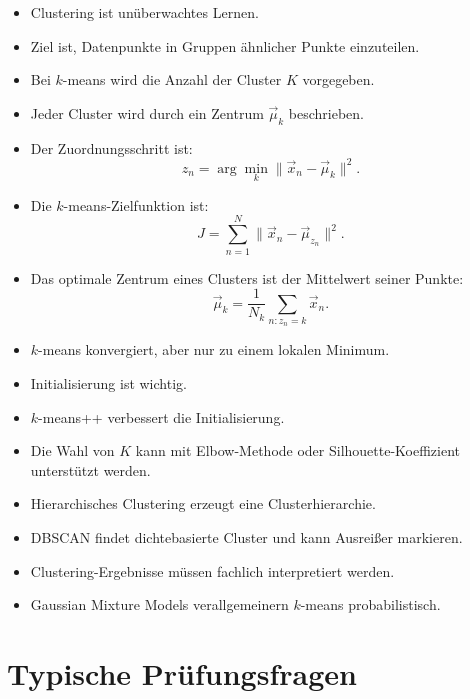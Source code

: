 \begin{itemize}
    \item Clustering ist unüberwachtes Lernen.
    \item Ziel ist, Datenpunkte in Gruppen ähnlicher Punkte einzuteilen.
    \item Bei \(k\)-means wird die Anzahl der Cluster \(K\) vorgegeben.
    \item Jeder Cluster wird durch ein Zentrum \(\vec{\mu}_k\) beschrieben.
    \item Der Zuordnungsschritt ist:
    \[
        z_n
        =
        \arg\min_k
        \|\vec{x}_n-\vec{\mu}_k\|^2.
    \]
    \item Die \(k\)-means-Zielfunktion ist:
    \[
        J
        =
        \sum_{n=1}^{N}
        \|\vec{x}_n-\vec{\mu}_{z_n}\|^2.
    \]
    \item Das optimale Zentrum eines Clusters ist der Mittelwert seiner Punkte:
    \[
        \vec{\mu}_k
        =
        \frac{1}{N_k}
        \sum_{n:z_n=k}
        \vec{x}_n.
    \]
    \item \(k\)-means konvergiert, aber nur zu einem lokalen Minimum.
    \item Initialisierung ist wichtig.
    \item \(k\)-means++ verbessert die Initialisierung.
    \item Die Wahl von \(K\) kann mit Elbow-Methode oder Silhouette-Koeffizient unterstützt werden.
    \item Hierarchisches Clustering erzeugt eine Clusterhierarchie.
    \item DBSCAN findet dichtebasierte Cluster und kann Ausreißer markieren.
    \item Clustering-Ergebnisse müssen fachlich interpretiert werden.
    \item Gaussian Mixture Models verallgemeinern \(k\)-means probabilistisch.
\end{itemize}

\section{Typische Prüfungsfragen}

